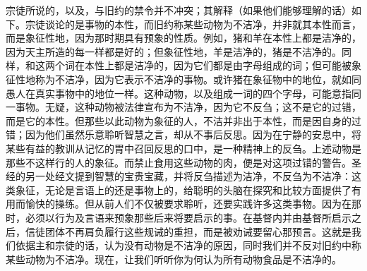 宗徒所说的，以及，与旧约的禁令并不冲突；其解释（如果他们能够理解的话）如下。宗徒谈论的是事物的本性，而旧约称某些动物为不洁净，并非就其本性而言，而是象征性地，因为那时期具有预象的性质。例如，猪和羊在本性上都是洁净的，因为天主所造的每一样都是好的；但象征性地，羊是洁净的，猪是不洁净的。同样，和这两个词在本性上都是洁净的，因为它们都是由字母组成的词；但可能被象征性地称为不洁净，因为它表示不洁净的事物。或许猪在象征物中的地位，就如同愚人在真实事物中的地位一样。这种动物，以及组成一词的四个字母，可能意指同一事物。无疑，这种动物被法律宣布为不洁净，因为它不反刍；这不是它的过错，而是它的本性。但那些以此动物为象征的人，不洁并非出于本性，而是因自身的过错；因为他们虽然乐意聆听智慧之言，却从不事后反思。因为在宁静的安息中，将某些有益的教训从记忆的胃中召回反思的口中，是一种精神上的反刍。上述动物是那些不这样行的人的象征。而禁止食用这些动物的肉，便是对这项过错的警告。圣经的另一处经文提到智慧的宝贵宝藏，并将反刍描述为洁净，不反刍为不洁净：这类象征，无论是言语上的还是事物上的，给聪明的头脑在探究和比较方面提供了有用而愉快的操练。但从前人们不仅被要求聆听，还要实践许多这类事物。因为在那时，必须以行为及言语来预象那些后来将要启示的事。在基督内并由基督所启示之后，信徒团体不再肩负履行这些规诫的重担，而是被劝诫要留心那预言。这就是我们依据主和宗徒的话，认为没有动物是不洁净的原因，同时我们并不反对旧约中称某些动物为不洁净。现在，让我们听听你为何认为所有动物食品是不洁净的。\par

